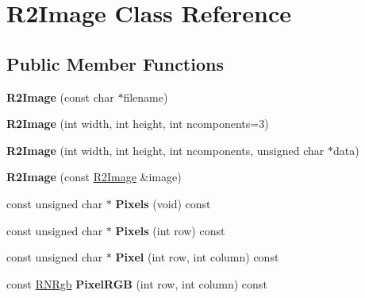 \hypertarget{class_r2_image}{}\section{R2\+Image Class Reference}
\label{class_r2_image}
\subsection*{Public Member Functions}
\begin{DoxyCompactItemize}
\item 
{\bfseries R2\+Image} (const char $\ast$filename)\hypertarget{class_r2_image_abb7d485cf017ab5df8ff3e6ca951faee}{}\label{class_r2_image_abb7d485cf017ab5df8ff3e6ca951faee}

\item 
{\bfseries R2\+Image} (int width, int height, int ncomponents=3)\hypertarget{class_r2_image_a2493d815820016e44870b26ead035a3d}{}\label{class_r2_image_a2493d815820016e44870b26ead035a3d}

\item 
{\bfseries R2\+Image} (int width, int height, int ncomponents, unsigned char $\ast$data)\hypertarget{class_r2_image_a825c0bc4a45ccf221f83bbf96930aa8e}{}\label{class_r2_image_a825c0bc4a45ccf221f83bbf96930aa8e}

\item 
{\bfseries R2\+Image} (const \hyperlink{class_r2_image}{R2\+Image} \&image)\hypertarget{class_r2_image_abca99477cc21af5724ca14486f7dd40d}{}\label{class_r2_image_abca99477cc21af5724ca14486f7dd40d}

\item 
const unsigned char $\ast$ {\bfseries Pixels} (void) const \hypertarget{class_r2_image_a957137d39a32134a5c8df2d991deba89}{}\label{class_r2_image_a957137d39a32134a5c8df2d991deba89}

\item 
const unsigned char $\ast$ {\bfseries Pixels} (int row) const \hypertarget{class_r2_image_a22cf58ed5b11c370308cccc0835294ca}{}\label{class_r2_image_a22cf58ed5b11c370308cccc0835294ca}

\item 
const unsigned char $\ast$ {\bfseries Pixel} (int row, int column) const \hypertarget{class_r2_image_a55c45677a74997b703c697c8888aff28}{}\label{class_r2_image_a55c45677a74997b703c697c8888aff28}

\item 
const \hyperlink{class_r_n_rgb}{R\+N\+Rgb} {\bfseries Pixel\+R\+GB} (int row, int column) const \hypertarget{class_r2_image_a57b951447bc579b51a4fc7d3fa239807}{}\label{class_r2_image_a57b951447bc579b51a4fc7d3fa239807}


\end{DoxyCompactItemize}
